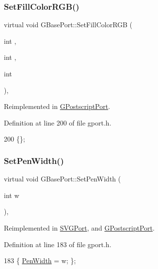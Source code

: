 \subsubsection{\texorpdfstring{Set\+Fill\+Color\+R\+G\+B()}{SetFillColorRGB()}}
{\footnotesize\ttfamily virtual void G\+Base\+Port\+::\+Set\+Fill\+Color\+R\+GB (\begin{DoxyParamCaption}\item[{int}]{,  }\item[{int}]{,  }\item[{int}]{ }\end{DoxyParamCaption})\hspace{0.3cm}{\ttfamily [inline]}, {\ttfamily [virtual]}}



Reimplemented in \mbox{\hyperlink{class_g_postscript_port_ad8157268c1db4307eca36108fdc1aa1e}{G\+Postscript\+Port}}.



Definition at line 200 of file gport.\+h.


\begin{DoxyCode}
200 \{\};
\end{DoxyCode}
\mbox{\label{class_g_base_port_aa2fd1fbe050cfea5a21afb7d4cecaa61}} 
\subsubsection{\texorpdfstring{Set\+Pen\+Width()}{SetPenWidth()}}
{\footnotesize\ttfamily virtual void G\+Base\+Port\+::\+Set\+Pen\+Width (\begin{DoxyParamCaption}\item[{int}]{w }\end{DoxyParamCaption})\hspace{0.3cm}{\ttfamily [inline]}, {\ttfamily [virtual]}}



Reimplemented in \mbox{\hyperlink{class_s_v_g_port_a3dbd4c8a9df41ccd1d05d362cec289a5}{S\+V\+G\+Port}}, and \mbox{\hyperlink{class_g_postscript_port_a63e3cf185f620f9f24ec40f01dc3b02c}{G\+Postscript\+Port}}.



Definition at line 183 of file gport.\+h.


\begin{DoxyCode}
183 \{ \mbox{\hyperlink{class_g_base_port_a9a76c3a8af8d0e9f29035d02d8f038c1}{PenWidth}} = w; \};
\end{DoxyCode}
\mbox{\label{class_g_base_port_aad9e21ed63c4f04a508e30b7f100fba5}} 

